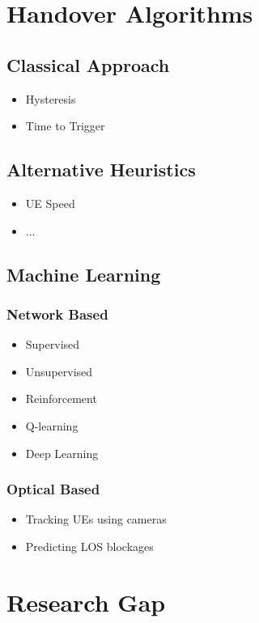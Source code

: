 \section{Handover Algorithms}
\subsection{Classical Approach}
\begin{itemize}
    \item Hysteresis
    \item Time to Trigger
\end{itemize}
\subsection{Alternative Heuristics}
\begin{itemize}
    \item UE Speed
    \item ...
\end{itemize}
\subsection{Machine Learning}
\subsubsection{Network Based}
\begin{itemize}
    \item Supervised
    \item Unsupervised
    \item Reinforcement
    \setlength{\itemindent}{2em}
    \item Q-learning
    \item Deep Learning
\end{itemize}
\subsubsection{Optical Based}
\begin{itemize}
    \item Tracking UEs using cameras
    \item Predicting LOS blockages
\end{itemize}
\section{Research Gap}